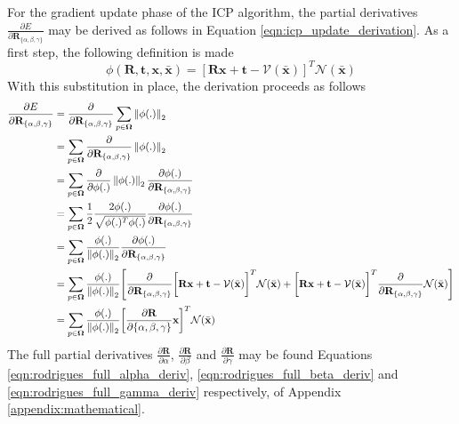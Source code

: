For the gradient update phase of the ICP algorithm, the partial derivatives
$\frac{\partial E}{\partial \mathbf{R}_{\{\alpha, \beta, \gamma\}}}$ may be
derived as follows in Equation \ref{eqn:icp_update_derivation}.
As a first step, the following definition is made
\begin{equation}
  \label{eqn:icp_deriv_sub}
  \phi(\mathbf{R}, \mathbf{t}, \mathbf{x}, \bar{\mathbf{x}}) =
  \left[
    \mathbf{Rx} + \mathbf{t} - \mathcal{V}(\bar{\mathbf{x}})
  \right]^{T}
  \mathcal{N}(\bar{\mathbf{x}})
\end{equation}
With this substitution in place, the derivation proceeds as follows
\begin{align}
  \label{eqn:icp_update_derivation_rot}
  \frac{\partial E}{\partial \mathbf{R}_{\{\alpha, \beta, \gamma\}}} & =
  \frac{\partial}{\partial \mathbf{R}_{\{\alpha, \beta, \gamma\}}}
  \sum_{p \in \mathbf{\Omega}}
  \left\lVert\phi(.)\right\rVert_{2}\\
  & = \sum_{p \in \mathbf{\Omega}}
  \frac{\partial}{\partial \mathbf{R}_{\{\alpha, \beta, \gamma\}}}
  \left\lVert\phi(.)\right\rVert_{2}\\
  & = \sum_{p \in \mathbf{\Omega}}
  \frac{\partial}{\partial \phi(.)} \left\lVert\phi(.)\right\rVert_{2}
  \frac{\partial \phi(.)}{\partial \mathbf{R}_{\{\alpha, \beta, \gamma\}}}\\
  & = \sum_{p \in \mathbf{\Omega}}
  \frac{1}{2}\frac{2 \phi(.)}{\sqrt{\phi(.)^{T}\phi(.)}}
  \frac{\partial \phi(.)}{\partial \mathbf{R}_{\{\alpha, \beta, \gamma\}}}\\
  & = \sum_{p \in \mathbf{\Omega}}
  \frac{\phi(.)}{\left\lVert\phi(.)\right\rVert_{2}}
  \frac{\partial \phi(.)}{\partial \mathbf{R}_{\{\alpha, \beta, \gamma\}}}\\
  & = \sum_{p \in \mathbf{\Omega}}
  \frac{\phi(.)}{\left\lVert\phi(.)\right\rVert_{2}}
  \Bigg[ \frac{\partial}{\partial \mathbf{R_{\{\alpha, \beta, \gamma\}}}}
  \bigg[ \mathbf{Rx} + \mathbf{t} - \mathcal{V}(\bar{\mathbf{x}}) \bigg]^{T}
  \mathcal{N}(\bar{\mathbf{x}}) + 
  \bigg[ \mathbf{Rx} + \mathbf{t} - \mathcal{V}(\bar{\mathbf{x}}) \bigg]^{T}
  \frac{\partial}{\partial \mathbf{R}_{\{\alpha, \beta, \gamma\}}}
  \mathcal{N}(\bar{\mathbf{x}})\Bigg]\\
  & = \sum_{p \in \mathbf{\Omega}}
  \frac{\phi(.)}{\left\lVert\phi(.)\right\rVert_{2}}
  \bigg[ \frac{\partial \mathbf{R}}{\partial \{\alpha, \beta, \gamma\}}
  \mathbf{x}\bigg]^{T}
  \mathcal{N}(\bar{\mathbf{x}})
\end{align}
The full partial derivatives $\frac{\partial \mathbf{R}}{\partial \alpha}$,
$\frac{\partial \mathbf{R}}{\partial \beta}$ and
$\frac{\partial \mathbf{R}}{\partial \gamma}$ may be found Equations
\ref{eqn:rodrigues_full_alpha_deriv}, \ref{eqn:rodrigues_full_beta_deriv}
and \ref{eqn:rodrigues_full_gamma_deriv} respectively, of Appendix 
\ref{appendix:mathematical}.

